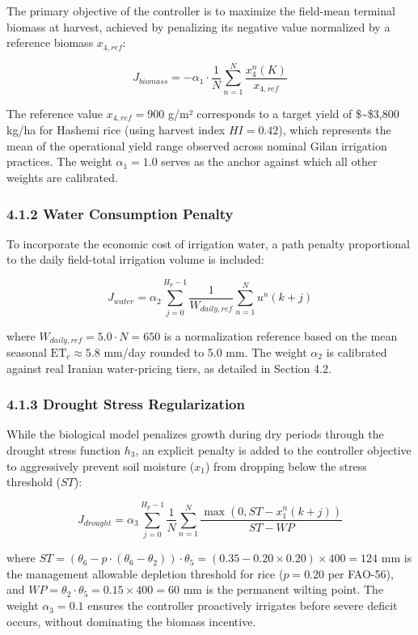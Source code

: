 The primary objective of the controller is to maximize the field-mean
terminal biomass at harvest, achieved by penalizing its negative value
normalized by a reference biomass \(x_{4,ref}\):

\[J_{biomass} = -\alpha_1 \cdot \frac{1}{N} \sum_{n=1}^N \frac{x_4^n(K)}{x_{4,ref}} \tag{10}\]

The reference value \(x_{4,ref} = 900\) g/m² corresponds to a target
yield of \$\sim\$3,800 kg/ha for Hashemi rice (using harvest index
\(HI = 0.42\)), which represents the mean of the operational yield range
observed across nominal Gilan irrigation practices. The weight
\(\alpha_1 = 1.0\) serves as the anchor against which all other weights
are calibrated.

\subsubsection{4.1.2 Water Consumption
Penalty}\label{water-consumption-penalty}

To incorporate the economic cost of irrigation water, a path penalty
proportional to the daily field-total irrigation volume is included:

\[J_{water} = \alpha_2 \sum_{j=0}^{H_p-1} \frac{1}{W_{daily,ref}} \sum_{n=1}^N u^n(k+j) \tag{11}\]

where \(W_{daily,ref} = 5.0 \cdot N = 650\) is a normalization reference
based on the mean seasonal \(\text{ET}_c \approx 5.8\) mm/day rounded to
5.0 mm. The weight \(\alpha_2\) is calibrated against real Iranian
water-pricing tiers, as detailed in Section 4.2.

\subsubsection{4.1.3 Drought Stress
Regularization}\label{drought-stress-regularization}

While the biological model penalizes growth during dry periods through
the drought stress function \(h_3\), an explicit penalty is added to the
controller objective to aggressively prevent soil moisture (\(x_1\))
from dropping below the stress threshold (\(ST\)):

\[J_{drought} = \alpha_3 \sum_{j=0}^{H_p-1} \frac{1}{N} \sum_{n=1}^N \frac{\max(0, ST - x_1^n(k+j))}{ST - WP} \tag{12}\]

where
\(ST = (\theta_6 - p \cdot (\theta_6 - \theta_2)) \cdot \theta_5 = (0.35 - 0.20 \times 0.20) \times 400 = 124\)
mm is the management allowable depletion threshold for rice
(\(p = 0.20\) per FAO-56), and
\(WP = \theta_2 \cdot \theta_5 = 0.15 \times 400 = 60\) mm is the
permanent wilting point. The weight \(\alpha_3 = 0.1\) ensures the
controller proactively irrigates before severe deficit occurs, without
dominating the biomass incentive.

